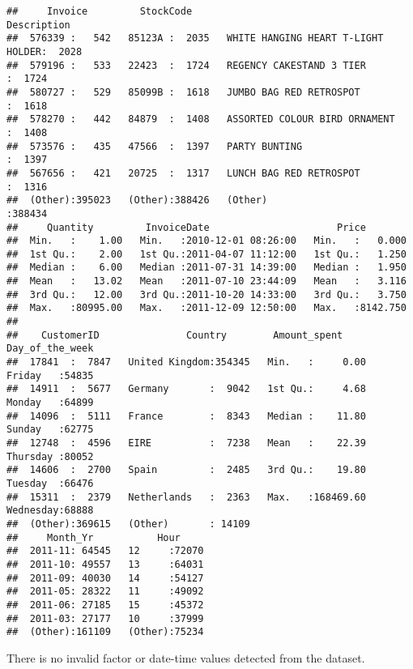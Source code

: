 \documentclass[
]{article}
\begin{document}
\begin{verbatim}
##     Invoice         StockCode                                  Description    
##  576339 :   542   85123A :  2035   WHITE HANGING HEART T-LIGHT HOLDER:  2028  
##  579196 :   533   22423  :  1724   REGENCY CAKESTAND 3 TIER          :  1724  
##  580727 :   529   85099B :  1618   JUMBO BAG RED RETROSPOT           :  1618  
##  578270 :   442   84879  :  1408   ASSORTED COLOUR BIRD ORNAMENT     :  1408  
##  573576 :   435   47566  :  1397   PARTY BUNTING                     :  1397  
##  567656 :   421   20725  :  1317   LUNCH BAG RED RETROSPOT           :  1316  
##  (Other):395023   (Other):388426   (Other)                           :388434  
##     Quantity         InvoiceDate                      Price         
##  Min.   :    1.00   Min.   :2010-12-01 08:26:00   Min.   :   0.000  
##  1st Qu.:    2.00   1st Qu.:2011-04-07 11:12:00   1st Qu.:   1.250  
##  Median :    6.00   Median :2011-07-31 14:39:00   Median :   1.950  
##  Mean   :   13.02   Mean   :2011-07-10 23:44:09   Mean   :   3.116  
##  3rd Qu.:   12.00   3rd Qu.:2011-10-20 14:33:00   3rd Qu.:   3.750  
##  Max.   :80995.00   Max.   :2011-12-09 12:50:00   Max.   :8142.750  
##                                                                     
##    CustomerID               Country        Amount_spent        Day_of_the_week 
##  17841  :  7847   United Kingdom:354345   Min.   :     0.00   Friday   :54835  
##  14911  :  5677   Germany       :  9042   1st Qu.:     4.68   Monday   :64899  
##  14096  :  5111   France        :  8343   Median :    11.80   Sunday   :62775  
##  12748  :  4596   EIRE          :  7238   Mean   :    22.39   Thursday :80052  
##  14606  :  2700   Spain         :  2485   3rd Qu.:    19.80   Tuesday  :66476  
##  15311  :  2379   Netherlands   :  2363   Max.   :168469.60   Wednesday:68888  
##  (Other):369615   (Other)       : 14109                                        
##     Month_Yr           Hour      
##  2011-11: 64545   12     :72070  
##  2011-10: 49557   13     :64031  
##  2011-09: 40030   14     :54127  
##  2011-05: 28322   11     :49092  
##  2011-06: 27185   15     :45372  
##  2011-03: 27177   10     :37999  
##  (Other):161109   (Other):75234
\end{verbatim}

There is no invalid factor or date-time values detected from the
dataset.
\end{document}
